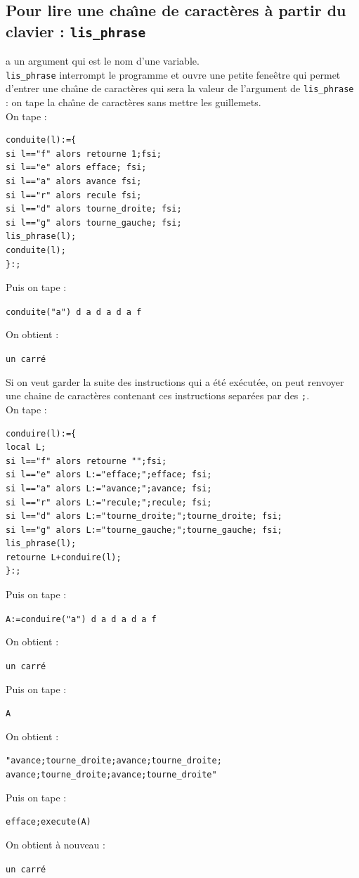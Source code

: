 \documentclass[a4paper,11pt]{book}
\begin{document}
\subsection{Pour lire une cha\^{\i}ne de caract\`eres \`a partir du clavier : {\tt lis\_phrase}}
 a un argument qui est le nom d'une variable.\\
{\tt lis\_phrase} interrompt le programme et ouvre une petite fene\^etre qui 
permet d'entrer une cha\^{\i}ne de caract\`eres qui sera la valeur de 
l'argument de {\tt lis\_phrase} : on tape la cha\^{\i}ne de caract\`eres sans
mettre les guillemets.\\
On tape :
\begin{verbatim}
conduite(l):={
si l=="f" alors retourne 1;fsi; 
si l=="e" alors efface; fsi;
si l=="a" alors avance fsi;
si l=="r" alors recule fsi;
si l=="d" alors tourne_droite; fsi;
si l=="g" alors tourne_gauche; fsi;
lis_phrase(l);
conduite(l);
}:;
\end{verbatim}
Puis on tape :
\begin{center}{\tt conduite("a") d a d a d a f}\end{center}
On obtient :
\begin{center}{\tt un carr\'e}\end{center}
Si on veut garder la suite des instructions qui a \'et\'e ex\'ecut\'ee, on peut
renvoyer une chaine de caract\`eres contenant ces instructions separ\'ees par 
des {\tt ;}.\\
On tape :
\begin{verbatim}
conduire(l):={
local L;
si l=="f" alors retourne "";fsi; 
si l=="e" alors L:="efface;";efface; fsi;
si l=="a" alors L:="avance;";avance; fsi;
si l=="r" alors L:="recule;";recule; fsi;
si l=="d" alors L:="tourne_droite;";tourne_droite; fsi;
si l=="g" alors L:="tourne_gauche;";tourne_gauche; fsi;
lis_phrase(l);
retourne L+conduire(l);
}:;
\end{verbatim}
Puis on tape :
\begin{center}{\tt A:=conduire("a") d a d a d a f}\end{center}
On obtient :
\begin{center}{\tt un carr\'e}\end{center}
Puis on tape :
\begin{center}{\tt A}\end{center}
On obtient :
\begin{center}{\tt "avance;tourne\_droite;avance;tourne\_droite;\\
  avance;tourne\_droite;avance;tourne\_droite"}\end{center}
Puis on tape :
\begin{center}{\tt  efface;execute(A)}\end{center}
On obtient \`a nouveau :
\begin{center}{\tt un carr\'e}\end{center}
\end{document}
